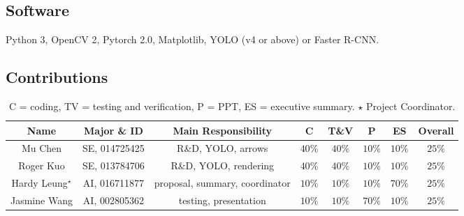 \documentclass[10pt]{article}
\begin{document}
\subsection*{Software}

Python 3, OpenCV 2, Pytorch 2.0, Matplotlib, YOLO (v4 or above) or Faster R-CNN.

\subsection*{Contributions}

\begin{table}[htbp]
\centering
\begin{tabular}{|c|c|c|c|c|c|c|c|}
\hline
Name & Major \& ID & Main Responsibility & \textsc{C} &
	\textsc{T\&V} & \textsc{P} & \textsc{ES} & Overall \\
\hline
Mu Chen & SE, 014725425 & R\&D, YOLO, arrows & $40\%$ & $40\%$ & $10\%$ & $10\%$ & $25\%$ \\
Roger Kuo & SE, 013784706 & R\&D, YOLO, rendering & $40\%$ & $40\%$ & $10\%$ & $10\%$ & $25\%$ \\
Hardy Leung${}^\star$ & AI, 016711877 &
proposal, summary, coordinator & $10\%$ & $10\%$ & $10\%$ & $70\%$ & $25\%$ \\
Jasmine Wang & AI, 002805362 & testing, presentation & $10\%$ & $10\%$ & $70\%$ & $10\%$ & $25\%$ \\ \hline
\end{tabular}
\caption{\textsc{C} = coding, \textsc{TV} =
testing and verification,
\textsc{P} = PPT, \textsc{ES} = executive summary. $\star$ Project Coordinator.
}
\end{table}

% 
% 
\end{document}
